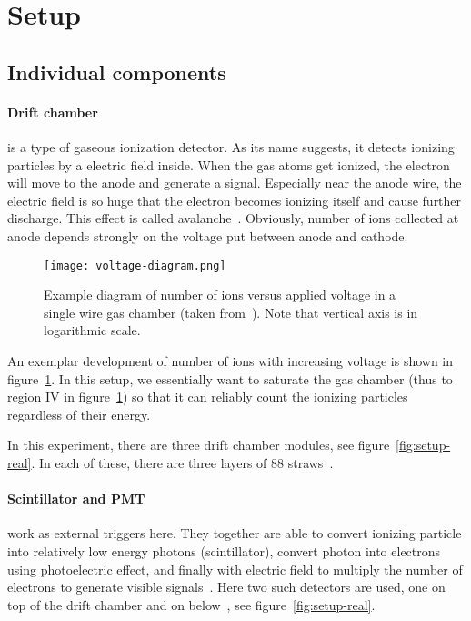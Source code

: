 \clearpage
\section{Setup}\label{sec:setup}

\subsection{Individual components}
\paragraph{Drift chamber}
\label{sec:drift}
is a type of gaseous ionization detector. As its name suggests, it detects ionizing particles by a electric field inside. When the gas atoms get ionized, the electron will move to the anode and generate a signal. Especially near the anode wire, the electric field is so huge that the electron becomes ionizing itself and cause further discharge. This effect is called avalanche~\cite{leo}. Obviously, number of ions collected at anode depends strongly on the voltage put between anode and cathode.

\begin{figure}[htpb]
	\centering
	\texttt{[image: voltage-diagram.png]}
	\caption{Example diagram of number of ions versus applied voltage in a single wire gas chamber (taken from~\cite{leo}). Note that vertical axis is in logarithmic scale. }%
	\label{fig:voltage-diagram}
\end{figure}
An exemplar development of number of ions with increasing voltage is shown in figure~\ref{fig:voltage-diagram}. In this setup, we essentially want to saturate the gas chamber (thus to region IV in figure~\ref{fig:voltage-diagram}) so that it can reliably count the ionizing particles regardless of their energy.

In this experiment, there are three drift chamber modules, see figure~\ref{fig:setup-real}. In each of these, there are three layers of $88$ straws~\cite{manual}.

\paragraph{Scintillator and PMT}
work as external triggers here. They together are able to convert ionizing particle into relatively low energy photons (scintillator), convert photon into electrons using photoelectric effect, and finally with electric field to multiply the number of electrons to generate visible signals~\cite{wermes}. Here two such detectors are used, one on top of the drift chamber and on below~\cite{manual}, see figure~\ref{fig:setup-real}.

